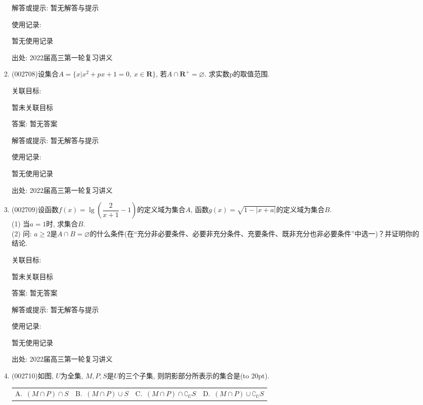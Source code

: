 \documentclass[10pt,a4paper]{article}
\newcommand{\bracket}[1]{(\hbox to #1pt{})}
\newcommand{\fourch}[4]{\par\begin{tabular}{p{.23\textwidth}p{.23\textwidth}p{.23\textwidth}p{.23\textwidth}}
A.~#1 &B.~#2& C.~#3& D.~#4
\end{tabular}}
\begin{document}
\begin{enumerate}[1.]
解答或提示: 暂无解答与提示

使用记录:

暂无使用记录


出处: 2022届高三第一轮复习讲义
\item { (002708)}设集合$A=\{x|x^2+px+1=0,\ x\in \mathbf{R}\}$, 若$A\cap \mathbf{R}^+=\varnothing$. 求实数p的取值范围.


关联目标:

暂未关联目标

答案: 暂无答案

解答或提示: 暂无解答与提示

使用记录:

暂无使用记录


出处: 2022届高三第一轮复习讲义
\item { (002709)}设函数$f(x)=\lg (\dfrac2{x+1}-1)$的定义域为集合$A$, 函数$g(x)=\sqrt{1-|x+a|}$的定义域为集合$B$.\\
(1) 当$a=1$时, 求集合$B$.\\
(2) 问: $a\ge 2$是$A\cap B=\varnothing$的什么条件(在``充分非必要条件、必要非充分条件、充要条件、既非充分也非必要条件''中选一)？并证明你的结论.


关联目标:

暂未关联目标

答案: 暂无答案

解答或提示: 暂无解答与提示

使用记录:

暂无使用记录


出处: 2022届高三第一轮复习讲义
\item { (002710)}如图, $U$为全集, $M,P,S$是$U$的三个子集, 则阴影部分所表示的集合是\bracket{20}.
\fourch{$(M\cap P)\cap S$}{$(M\cap P)\cup S$}{$(M\cap P)\cap \complement_U S$}{$(M\cap P)\cup \complement_U S$}
\begin{center}
\end{center}



\end{enumerate}
\end{document}
